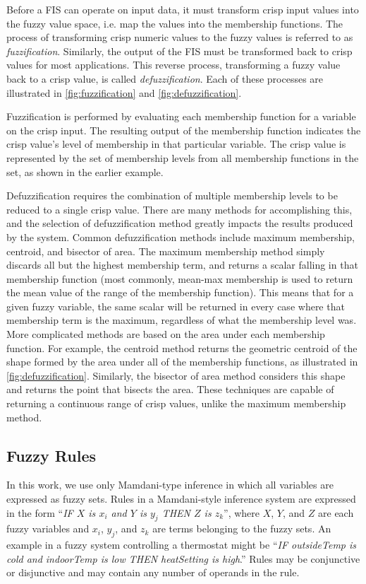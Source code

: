 \documentclass[12pt]{report}
\begin{document}
Before a FIS can operate on input data, it must transform crisp input values into the fuzzy value space, i.e. map the values into the membership functions. The process of transforming crisp numeric values to the fuzzy values is referred to as \emph{fuzzification}. Similarly, the output of the FIS must be transformed back to crisp values for most applications. This reverse process, transforming a fuzzy value back to a crisp value, is called \emph{defuzzification}. Each of these processes are illustrated in \ref{fig:fuzzification} and \ref{fig:defuzzification}. 

Fuzzification is performed by evaluating each membership function for a variable on the crisp input. The resulting output of the membership function indicates the crisp value's level of membership in that particular variable. The crisp value is represented by the set of membership levels from all membership functions in the set, as shown in the earlier example.

Defuzzification requires the combination of multiple membership levels to be reduced to a single crisp value. There are many methods for accomplishing this, and the selection of defuzzification method greatly impacts the results produced by the system. Common defuzzification methods include maximum membership, centroid, and bisector of area. The maximum membership method simply discards all but the highest membership term, and returns a scalar falling in that membership function (most commonly, mean-max membership is used to return the mean value of the range of the membership function). This means that for a given fuzzy variable, the same scalar will be returned in every case where that membership term is the maximum, regardless of what the membership level was. More complicated methods are based on the area under each membership function. For example, the centroid method returns the geometric centroid of the shape formed by the area under all of the membership functions, as illustrated in \ref{fig:defuzzification}. Similarly, the bisector of area method considers this shape and returns the point that bisects the area. These techniques are capable of returning a continuous range of crisp values, unlike the maximum membership method.

\subsection{Fuzzy Rules}

In this work, we use only Mamdani-type inference in which all variables are expressed as fuzzy sets. Rules in a Mamdani-style inference system are expressed in the form ``\emph{IF $X$ is $x_i$ and $Y$ is $y_j$ THEN $Z$ is $z_k$}'', where $X$, $Y$, and $Z$ are each fuzzy variables and $x_i$, $y_j$, and $z_k$ are terms belonging to the fuzzy sets. An example in a fuzzy system controlling a thermostat might be ``\emph{IF outsideTemp is cold and indoorTemp is low THEN heatSetting is high}.'' Rules may be conjunctive or disjunctive and may contain any number of operands in the rule.
\end{document}
